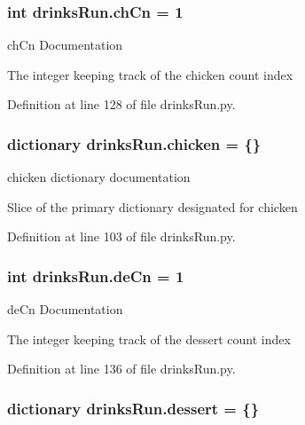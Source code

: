 \hypertarget{namespacedrinksRun_a31dc829bbf1db0331265c69e22a6e301}{
\subsubsection[{ch\-Cn}]{\setlength{\rightskip}{0pt plus 5cm}int drinks\-Run.\-ch\-Cn = 1}}\label{namespacedrinksRun_a31dc829bbf1db0331265c69e22a6e301}


ch\-Cn Documentation 

The integer keeping track of the chicken count index 

Definition at line 128 of file drinks\-Run.\-py.

\hypertarget{namespacedrinksRun_aeed34a0fd8bbfc45bcde51104111ed3f}{
\subsubsection[{chicken}]{\setlength{\rightskip}{0pt plus 5cm}dictionary drinks\-Run.\-chicken = \{\}}}\label{namespacedrinksRun_aeed34a0fd8bbfc45bcde51104111ed3f}


chicken dictionary documentation 

Slice of the primary dictionary designated for chicken 

Definition at line 103 of file drinks\-Run.\-py.

\hypertarget{namespacedrinksRun_a3289d16d8767b8bc392ffbdf15ea01e5}{
\subsubsection[{de\-Cn}]{\setlength{\rightskip}{0pt plus 5cm}int drinks\-Run.\-de\-Cn = 1}}\label{namespacedrinksRun_a3289d16d8767b8bc392ffbdf15ea01e5}


de\-Cn Documentation 

The integer keeping track of the dessert count index 

Definition at line 136 of file drinks\-Run.\-py.

\hypertarget{namespacedrinksRun_a14134319968594930401ef12e1aebb71}{
\subsubsection[{dessert}]{\setlength{\rightskip}{0pt plus 5cm}dictionary drinks\-Run.\-dessert = \{\}}}\label{namespacedrinksRun_a14134319968594930401ef12e1aebb71}


